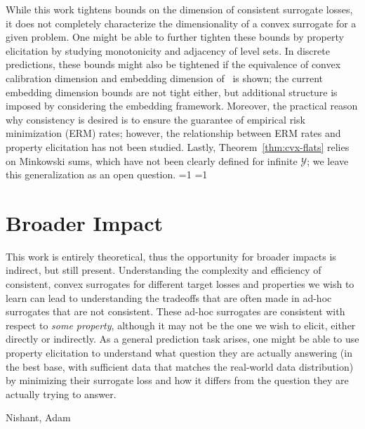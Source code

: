 \documentclass{article}
\newcommand{\Comments}{1}
\newcommand{\mytodo}[2]{\ifnum\Comments=1%
	\todo[linecolor=#1!80!black,backgroundcolor=#1,bordercolor=#1!80!black]{#2}\fi}
\newcommand{\btw}[1]{\mytodo{gray!10!white}{\textcolor{gray}{BTW: #1}}}%
\newcommand{\Y}{\mathcal{Y}}
\begin{document}
While this work tightens bounds on the dimension of consistent surrogate losses, it does not completely characterize the dimensionality of a convex surrogate for a given problem.
One might be able to further tighten these bounds by property elicitation by studying monotonicity and adjacency of level sets.
In discrete predictions, these bounds might also be tightened if the equivalence of convex calibration dimension and embedding dimension of~\citet{finocchiaro2020embedding} is shown; the current embedding dimension bounds are not tight either, but additional structure is imposed by considering the embedding framework.
Moreover, the practical reason why consistency is desired is to ensure the guarantee of empirical risk minimization (ERM) rates; however, the relationship between ERM rates and property elicitation has not been studied.
Lastly, Theorem~\ref{thm:cvx-flats} relies on Minkowski sums, which have not been clearly defined for infinite $\Y$; we leave this generalization as an open question.
\btw{Infinite losses/minnable restriction}
\btw{two questions: 1. if dim d loss works, does dim d minnable loss work? 2. would defining rays as part of the support space work?}

\newpage

\section*{Broader Impact}
This work is entirely theoretical, thus the opportunity for broader impacts is indirect, but still present.
Understanding the complexity and efficiency of consistent, convex surrogates for different target losses and properties we wish to learn can lead to understanding the tradeoffs that are often made in ad-hoc surrogates that are not consistent.
These ad-hoc surrogates are consistent with respect to \emph{some property}, although it may not be the one we wish to elicit, either directly or indirectly.
As a general prediction task arises, one might be able to use property elicitation to understand what question they are actually answering (in the best base, with sufficient data that matches the real-world data distribution) by minimizing their surrogate loss and how it differs from the question they are actually trying to answer.

\begin{ack}
Nishant, Adam
\end{ack}



\end{document}
